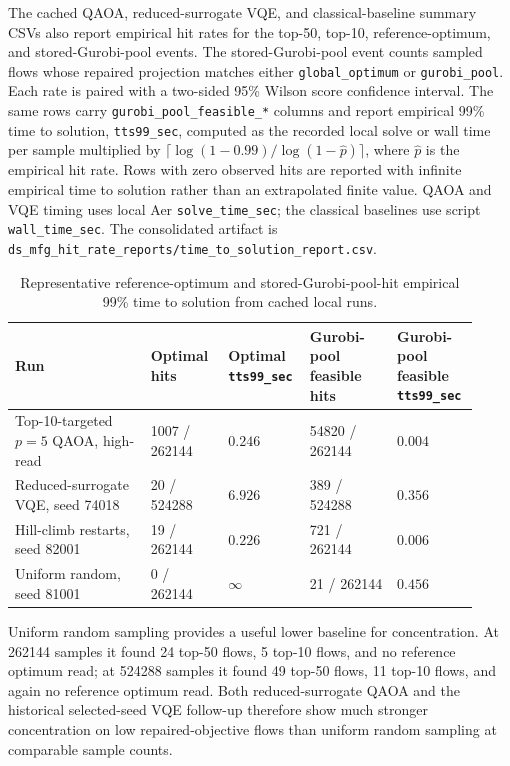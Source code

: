 The cached QAOA, reduced-surrogate VQE, and classical-baseline summary CSVs
also report empirical hit rates for the top-50, top-10, reference-optimum, and
stored-Gurobi-pool events. The stored-Gurobi-pool event counts sampled
flows whose repaired projection matches either \texttt{global\_optimum} or
\texttt{gurobi\_pool}. Each rate is paired with a two-sided 95\% Wilson score
confidence interval. The same rows carry \texttt{gurobi\_pool\_feasible\_*}
columns and report empirical 99\% time to solution,
\texttt{tts99\_sec}, computed as the recorded local solve or wall time per
sample multiplied by
$\lceil \log(1 - 0.99) / \log(1 - \hat{p}) \rceil$, where $\hat{p}$ is the
empirical hit rate. Rows with zero observed hits are reported with infinite
empirical time to solution rather than an extrapolated finite value. QAOA and
VQE timing uses local Aer \texttt{solve\_time\_sec}; the classical baselines
use script \texttt{wall\_time\_sec}. The consolidated artifact is
\texttt{ds\_mfg\_hit\_rate\_reports/time\_to\_solution\_report.csv}.

\begin{table}[t]
\centering
\scriptsize
\caption{Representative reference-optimum and stored-Gurobi-pool-hit empirical 99\% time to
solution from cached local runs.}
\label{tab:ds-mfg-reference-hit-uncertainty}
\begin{tabular}{p{0.28\linewidth}p{0.16\linewidth}p{0.15\linewidth}p{0.18\linewidth}p{0.15\linewidth}}
\hline
Run & Optimal hits & Optimal \texttt{tts99\_sec} & Gurobi-pool feasible hits & Gurobi-pool feasible \texttt{tts99\_sec} \\
\hline
Top-10-targeted $p=5$ QAOA, high-read & 1007 / 262144 & $0.246$ &
54820 / 262144 & $0.004$ \\
\hline
Reduced-surrogate VQE, seed 74018 & 20 / 524288 & $6.926$ &
389 / 524288 & $0.356$ \\
\hline
Hill-climb restarts, seed 82001 & 19 / 262144 & $0.226$ &
721 / 262144 & $0.006$ \\
\hline
Uniform random, seed 81001 & 0 / 262144 & $\infty$ &
21 / 262144 & $0.456$ \\
\hline
\end{tabular}
\end{table}

Uniform random sampling provides a useful lower baseline for concentration. At
262144 samples it found 24 top-50 flows, 5 top-10 flows, and no reference optimum
read; at 524288 samples it found 49 top-50 flows, 11 top-10 flows, and again no
reference optimum read. Both reduced-surrogate QAOA and the historical selected-seed VQE follow-up
therefore show much stronger concentration on low repaired-objective flows than
uniform random sampling at comparable sample counts.

